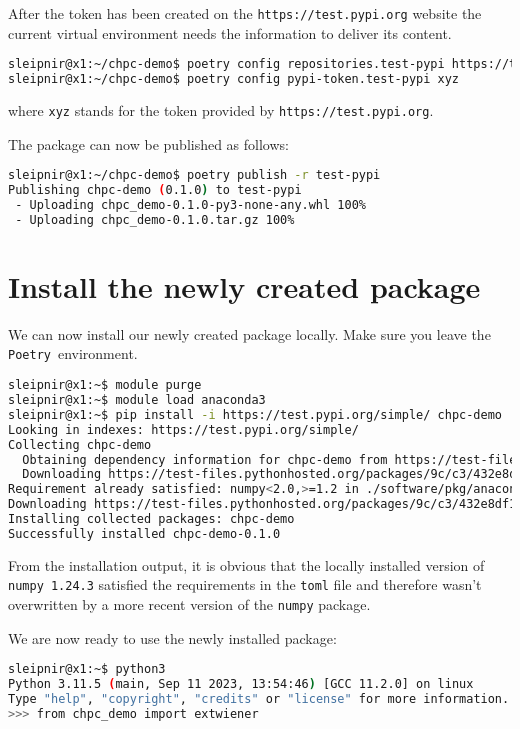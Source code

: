 \documentclass[10pt]{article}
\newcommand{\POETRY}{\texttt{Poetry}}
\begin{document}
After the token has been created on the \texttt{https://test.pypi.org} website the current virtual environment 
needs the information to deliver its content.
\begin{lstlisting}[language=bash]
sleipnir@x1:~/chpc-demo$ poetry config repositories.test-pypi https://test.pypi.org/legacy/
sleipnir@x1:~/chpc-demo$ poetry config pypi-token.test-pypi xyz
\end{lstlisting}
where \texttt{xyz} stands for the token provided by \texttt{https://test.pypi.org}.

The package can now be published as follows:
\begin{lstlisting}[language=bash]
sleipnir@x1:~/chpc-demo$ poetry publish -r test-pypi
Publishing chpc-demo (0.1.0) to test-pypi
 - Uploading chpc_demo-0.1.0-py3-none-any.whl 100%
 - Uploading chpc_demo-0.1.0.tar.gz 100%
\end{lstlisting}

\section{Install the newly created package}
We can now install our newly created package locally. Make sure you leave the \POETRY\ environment.
\begin{lstlisting}[language=bash]
sleipnir@x1:~$ module purge
sleipnir@x1:~$ module load anaconda3
sleipnir@x1:~$ pip install -i https://test.pypi.org/simple/ chpc-demo
Looking in indexes: https://test.pypi.org/simple/
Collecting chpc-demo
  Obtaining dependency information for chpc-demo from https://test-files.pythonhosted.org/packages/9c/c3/432e8df10a5db0e3d6b6963c41638f8b9e6b7b24d81fd759932e0dfa7d3e/chpc_demo-0.1.0-py3-none-any.whl.metadata
  Downloading https://test-files.pythonhosted.org/packages/9c/c3/432e8df10a5db0e3d6b6963c41638f8b9e6b7b24d81fd759932e0dfa7d3e/chpc_demo-0.1.0-py3-none-any.whl.metadata (664 bytes)
Requirement already satisfied: numpy<2.0,>=1.2 in ./software/pkg/anaconda3/2023.09/lib/python3.11/site-packages (from chpc-demo) (1.24.3)
Downloading https://test-files.pythonhosted.org/packages/9c/c3/432e8df10a5db0e3d6b6963c41638f8b9e6b7b24d81fd759932e0dfa7d3e/chpc_demo-0.1.0-py3-none-any.whl (3.4 kB)
Installing collected packages: chpc-demo
Successfully installed chpc-demo-0.1.0
\end{lstlisting}
From the installation output, it is obvious that the locally installed version of \texttt{numpy 1.24.3} satisfied the requirements in the \texttt{toml} file
and therefore wasn't overwritten by a more recent version of the \texttt{numpy} package.

We are now ready to use the newly installed package:
\begin{lstlisting}[language=bash]
sleipnir@x1:~$ python3
Python 3.11.5 (main, Sep 11 2023, 13:54:46) [GCC 11.2.0] on linux
Type "help", "copyright", "credits" or "license" for more information.
>>> from chpc_demo import extwiener
\end{lstlisting}



\end{document}
